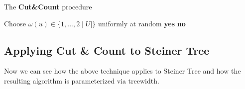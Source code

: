 \documentclass{article}
\theoremstyle{definition}
\theoremstyle{lemma}
\theoremstyle{corollary}
\theoremstyle{theorem}
\begin{document}
\begin{algorithm}[H]
	\SetAlgoLined
	\caption{The \textbf{Cut\&Count} procedure}
	 {
		Choose $\omega(u) \in \{ 1,...,2 \mid U \mid \}$ uniformly at random
	}
	 {
		 {
			\KwRet \textbf{yes}		
		}
	}
	\KwRet \textbf{no}
\end{algorithm}

\subsection{Applying Cut \& Count to Steiner Tree}
Now we can see how the above technique applies to Steiner Tree and how the resulting algorithm is parameterized via treewidth. \\
\end{document}
